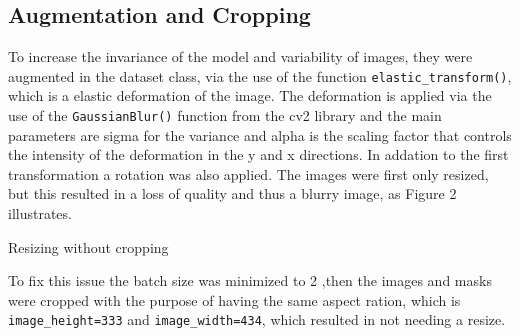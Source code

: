 \documentclass{article}
\begin{document}
\begin{multicols}{2}
\subsection{Augmentation and Cropping}
To increase the invariance of the model and variability of images, they were augmented in the dataset class, via the use of the function \texttt{elastic_transform()},
which is a elastic deformation of the image. The deformation is applied via the use of the \texttt{GaussianBlur()} function from the cv2 library and the main parameters are 
sigma for the variance and alpha is the scaling factor that controls the intensity of the deformation in the y and x directions. In addation to the first transformation a 
rotation was also applied. The images were first only resized, but this resulted in a loss of quality and thus a blurry image, as Figure 2 illustrates. 
\noindent
\begin{minipage}{\columnwidth}
  \makeatletter
  \newcommand{\@captype}{figure}
  \makeatother
  \centering
  \qquad%
  \caption{Resizing without cropping}
\end{minipage}
To fix this issue the batch size was minimized to 2 ,then the images and masks were cropped with the purpose of having the same aspect ration, which is \texttt{image_height=333}
and \texttt{image_width=434}, which resulted in not needing a resize.


\end{multicols}
\end{document}

